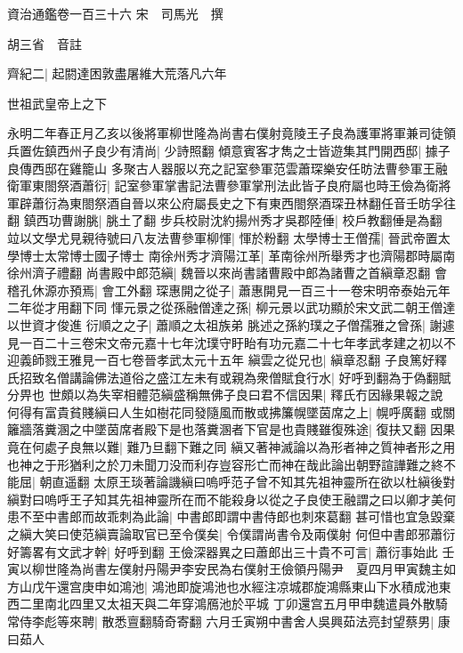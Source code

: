 資治通鑑卷一百三十六
宋　司馬光　撰

胡三省　音註

齊紀二|{
	起閼達困敦盡屠維大荒落凡六年}


世祖武皇帝上之下

永明二年春正月乙亥以後將軍柳世隆為尚書右僕射竟陵王子良為護軍將軍兼司徒領兵置佐鎮西州子良少有清尚|{
	少詩照翻}
傾意賓客才雋之士皆遊集其門開西邸|{
	據子良傳西邸在雞籠山}
多聚古人器服以充之記室參軍范雲蕭琛樂安任昉法曹參軍王融衛軍東閤祭酒蕭衍|{
	記室參軍掌書記法曹參軍掌刑法此皆子良府屬也時王儉為衛將軍辟蕭衍為東閤祭酒自晉以來公府屬長史之下有東西閤祭酒琛丑林翻任音壬昉孚往翻}
鎮西功曹謝朓|{
	朓土了翻}
步兵校尉沈約揚州秀才吳郡陸倕|{
	校戶教翻倕是為翻}
竝以文學尤見親待號曰八友法曹參軍柳惲|{
	惲於粉翻}
太學博士王僧孺|{
	晉武帝置太學博士太常博士國子博士}
南徐州秀才濟陽江革|{
	革南徐州所舉秀才也濟陽郡時屬南徐州濟子禮翻}
尚書殿中郎范縝|{
	魏晉以來尚書諸曹殿中郎為諸曹之首縝章忍翻}
會稽孔休源亦預焉|{
	會工外翻}
琛惠開之從子|{
	蕭惠開見一百三十一卷宋明帝泰始元年二年從才用翻下同}
惲元景之從孫融僧達之孫|{
	柳元景以武功顯於宋文武二朝王僧達以世資才俊進}
衍順之之子|{
	蕭順之太祖族弟}
朓述之孫約璞之子僧孺雅之曾孫|{
	謝遽見一百二十三卷宋文帝元嘉十七年沈璞守盱眙有功元嘉二十七年孝武孝建之初以不迎義師戮王雅見一百七卷晉孝武太元十五年}
縝雲之從兄也|{
	縝章忍翻}
子良篤好釋氏招致名僧講論佛法道俗之盛江左未有或親為衆僧賦食行水|{
	好呼到翻為于偽翻賦分畀也}
世頗以為失宰相體范縝盛稱無佛子良曰君不信因果|{
	釋氏冇因緣果報之說}
何得有富貴貧賤縝曰人生如樹花同發隨風而散或拂簾幌墜茵席之上|{
	幌呼廣翻}
或關籬牆落糞溷之中墜茵席者殿下是也落糞溷者下官是也貴賤雖復殊途|{
	復扶又翻}
因果竟在何處子良無以難|{
	難乃旦翻下難之同}
縝又著神滅論以為形者神之質神者形之用也神之于形猶利之於刀未聞刀没而利存豈容形亡而神在哉此論出朝野諠譁難之終不能屈|{
	朝直遥翻}
太原王琰著論譏縝曰嗚呼范子曾不知其先祖神靈所在欲以杜縝後對縝對曰嗚呼王子知其先祖神靈所在而不能殺身以從之子良使王融謂之曰以卿才美何患不至中書郎而故乖刺為此論|{
	中書郎即謂中書侍郎也刺來葛翻}
甚可惜也宜急毀棄之縝大笑曰使范縝賣論取官已至令僕矣|{
	令僕謂尚書令及兩僕射}
何但中書郎邪蕭衍好籌畧有文武才幹|{
	好呼到翻}
王儉深器異之曰蕭郎出三十貴不可言|{
	蕭衍事始此}
壬寅以柳世隆為尚書左僕射丹陽尹李安民為右僕射王儉領丹陽尹　夏四月甲寅魏主如方山戊午還宫庚申如鴻池|{
	鴻池即旋鴻池也水經注凉城郡旋鴻縣東山下水積成池東西二里南北四里又太祖天與二年穿鴻鴈池於平城}
丁卯還宫五月甲申魏遣員外散騎常侍李彪等來聘|{
	散悉亶翻騎奇寄翻}
六月壬寅朔中書舍人吳興茹法亮封望蔡男|{
	康曰茹人}


